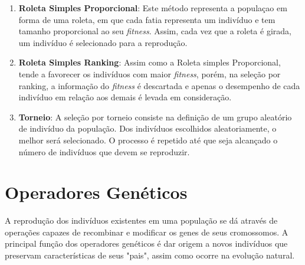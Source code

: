\documentclass[12pt]{article}
\begin{document}
\begin{enumerate}[\textbf{(i)}]
	\item \textbf{Roleta Simples Proporcional}: Este método representa a populaçao em forma de
		  uma roleta, em que cada fatia representa um indivíduo e tem tamanho proporcional ao
		  seu \textit{fitness}. Assim, cada vez que a roleta é girada, um indivíduo é selecionado
		  para a reprodução.

	\item \textbf{Roleta Simples Ranking}: Assim como a Roleta simples Proporcional, tende a
		  favorecer os indivíduos com maior \textit{fitness}, porém, na seleção por ranking, a
		  informação do \textit{fitness} é descartada e apenas o desempenho de cada indivíduo em
		  relação aos demais é levada em consideração.

	\item \textbf{Torneio}: A seleção por torneio consiste na definição de um grupo aleatório de
		  indivíduo da população. Dos indivíduos escolhidos aleatoriamente, o melhor será
		  selecionado. O processo é repetido até que seja alcançado o número de indivíduos que
		  devem se reproduzir.

\end{enumerate}

\section{Operadores Genéticos}
A reprodução dos indivíduos existentes em uma população se dá através de operações capazes de
recombinar e modificar os genes de seus cromossomos. A principal função dos operadores genéticos
é dar origem a novos indivíduos que preservam características de seus "pais", assim como ocorre
na evolução natural.
\end{document}
